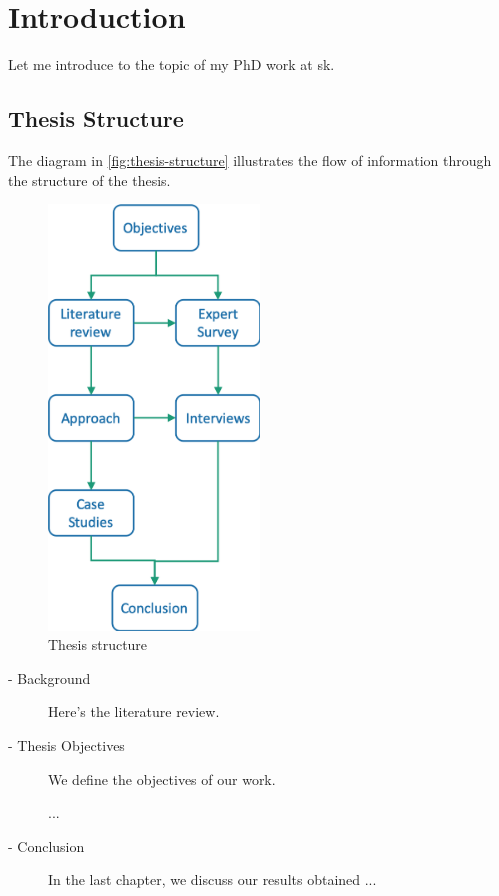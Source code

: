 \chapter{Introduction}

Let me introduce to the topic of my PhD work at \acrfull{sk}.


\section{Thesis Structure}
The diagram in \autoref{fig:thesis-structure} illustrates the flow of information through the structure of the thesis.

\begin{figure}[htb!]
\centering \includegraphics[width=0.5\textwidth]{graphics/thesis-structure}
\caption{Thesis structure}
\label{fig:thesis-structure}
\end{figure}

\begin{description}
    \item[ - Background]
Here's the literature review.

    \item[ - Thesis Objectives]
We define the objectives of our work.

...

    \item[ - Conclusion]
In the last chapter, we discuss our results obtained ...

\end{description}


